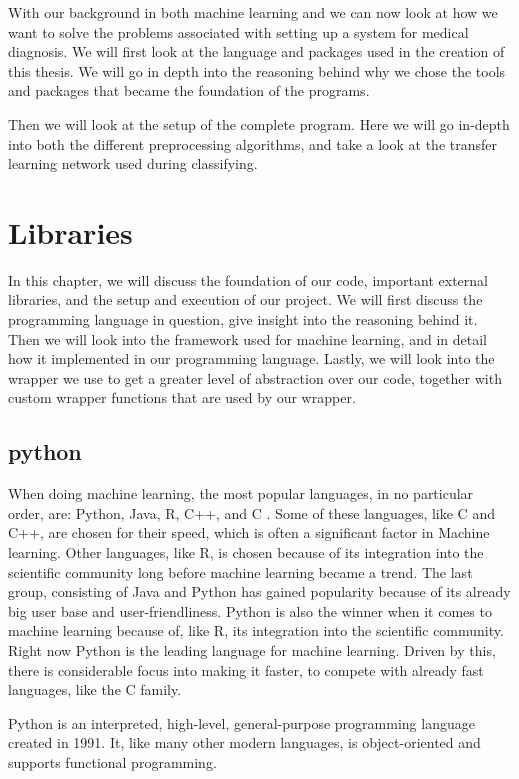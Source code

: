 With our background in both machine learning and  we can now look at how we want to solve the problems associated with setting up a system for medical diagnosis.  
We will first look at the language and packages used in the creation of this thesis. We will go in depth into the reasoning behind why we chose the tools and packages that became the foundation of the programs. 

Then we will look at the setup of the complete program. Here we will go in-depth into both the different preprocessing algorithms, and take a look at the transfer learning network used during classifying.


\section{Libraries} 
In this chapter, we will discuss the foundation of our code, important external libraries, and the setup and execution of our project.  
We will first discuss the programming language in question, give insight into the reasoning behind it. Then we will look into the framework used for machine learning, and in detail how it implemented in our programming language. Lastly, we will look into the wrapper we use to get a greater level of abstraction over our code, together with custom wrapper functions that are used by our wrapper. 

\subsection{python}
When doing machine learning, the most popular languages, in no particular order, are: Python, Java, R, C++, and C . Some of these languages, like C and C++, are chosen for their speed, which is often a significant factor in Machine learning. Other languages, like R, is chosen because of its integration into the scientific community long before machine learning became a trend. The last group, consisting of Java and Python has gained popularity because of its already big user base and user-friendliness. Python is also the winner when it comes to machine learning because of, like R, its integration into the scientific community. 
Right now Python is the leading language for machine learning. Driven by this, there is considerable focus into making it faster, to compete with already fast languages, like the C family. 

Python is an interpreted, high-level, general-purpose programming language created in 1991.   It, like many other modern languages, is object-oriented and supports functional programming. 

